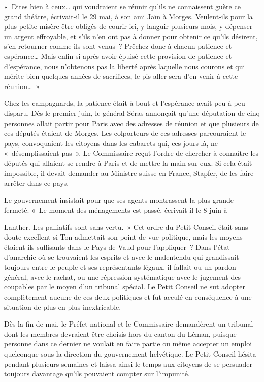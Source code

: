 \documentclass[french,twoside]{book} %
\newenvironment{quoteblock}%
  {\begin{quoting}}
  {\end{quoting}}
\newenvironment{quotebar}{%
    \def\FrameCommand{{\color{rubric!10!}\vrule width 0.5em} \hspace{0.9em}}%
    \def\OuterFrameSep{\itemsep} %
    \MakeFramed {\advance\hsize-\width \FrameRestore}
  }%
  {%
    \endMakeFramed
  }
\renewenvironment{quoteblock}%
  {%
    \savenotes
    \setstretch{0.9}
    \normalfont
    \begin{quotebar}
  }
  {%
    \end{quotebar}
    \spewnotes
  }
\begin{document}
\begin{quoteblock}
 \noindent « Dites bien à ceux… qui voudraient se réunir qu’ils ne connaissent guère ce grand théâtre, écrivait-il le 29 mai, à son ami Jaïn à Morges. Veulent-ils pour la plus petite misère être obligés de courir ici, y languir plusieurs mois, y dépenser un argent effroyable, et s’ils n’en ont pas à donner pour obtenir ce qu’ils désirent, s’en retourner comme ils sont venus ? Prêchez donc à chacun patience et espérance… Mais enfin si après avoir épuisé cette provision de patience et d’espérance, nous n’obtenons pas la liberté après laquelle nous courons et qui mérite bien quelques années de sacrifices, le pis aller sera d’en venir à cette réunion… »
 \end{quoteblock}

\noindent Chez les campagnards, la patience était à bout et l’espérance avait peu à peu disparu. Dès le premier juin, le général Séras annonçait qu’une députation de cinq personnes allait partir pour Paris avec des adresses de réunion et que plusieurs de ces députés étaient de Morges. Les colporteurs de ces adresses parcouraient le pays, convoquaient les citoyens dans les cabarets qui, ces jours-là, ne « désemplissaient pas ». Le Commissaire reçut l’ordre de chercher à connaître les députés qui allaient se rendre à Paris et de mettre la main sur eux. Si cela était impossible, il devait demander au Ministre suisse en France, Stapfer, de les faire arrêter dans ce pays.\par
Le gouvernement insistait pour que ses agents montrassent la plus grande fermeté. « Le moment des ménagements est passé, écrivait-il le 8 juin à\par
Lanther. Les palliatifs sont sans vertu. » Cet ordre du Petit Conseil était sans doute excellent si Ton admettait son point de vue politique, mais les moyens étaient-ils suffisants dans le Pays de Vaud pour l’appliquer ? Dans l’état d’anarchie où se trouvaient les esprits et avec le malentendu qui grandissait toujours entre le peuple et ses représentants légaux, il fallait ou un pardon général, avec le rachat, ou une répression systématique avec le jugement des coupables par le moyen d’un tribunal spécial. Le Petit Conseil ne sut adopter complètement aucune de ces deux politiques et fut acculé en conséquence à une situation de plus en plus inextricable.\par
Dès la fin de mai, le Préfet national et le Commissaire demandèrent un tribunal dont les membres devraient être choisis hors du canton du Léman, puisque personne dans ce dernier ne voulait en faire partie ou même accepter un emploi quelconque sous la direction du gouvernement helvétique. Le Petit Conseil hésita pendant plusieurs semaines et laissa ainsi le temps aux citoyens de se persuader toujours davantage qu’ils pouvaient compter sur l’impunité.\par
\end{document}
